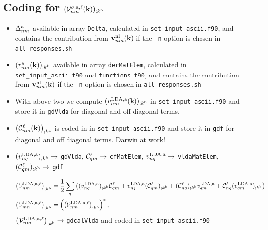 \subsection{Coding for $({\mathbf{\cal V}}^{\sigma,\mathrm{a},\ell}_{nm}(\mathbf{k}))_{;k^{\mathrm{b}}}$}
\begin{itemize}
\item $\Delta^{\mathrm{a}}_{nm}$ available in array \verb=Delta=, 
calculated in \verb=set_input_ascii.f90=,
 and contains the
  contribution from $\mathbf{v}^{\mathrm{nl}}_{nm}(\mathbf{k})$ if the \verb=-n= option is
  chosen in \verb=all_responses.sh= 
\item $(r^{\mathrm{a}}_{nm}(\mathbf{k}))_{;k^{\mathrm{b}}}$
 available in array
  \verb=derMatElem=,
calculated in \verb=set_input_ascii.f90= and \verb=functions.f90=,
 and contains the
  contribution from $\mathbf{v}^{\mathrm{nl}}_{nm}(\mathbf{k})$ if the \verb=-n= option is
  chosen in \verb=all_responses.sh= 
\item With above two we compute $(v^{\mathrm{LDA},\mathrm{a}}_{nm}(\mathbf{k}))_{;k^{\mathrm{b}}}$ 
in \verb=set_input_ascii.f90=  and store it in \verb=gdVlda= for
diagonal and off diagonal terms.
\item $\big({\mathbf{\cal C}}^\ell_{nm}(\mathbf{k})\big)_{;k^{\mathrm{a}}}$ is coded in 
in \verb=set_input_ascii.f90=  and store it in \verb=gdf= for
diagonal and off diagonal terms. Darwin at work!
\item $(v^{\mathrm{LDA},\mathrm{a}}_{nq})_{;k^{\mathrm{b}}}\to$ \verb=gdVlda=,
  ${\mathbf{\cal C}}^\ell_{qm}\to$ \verb=cfMatElem=,
$v^{\mathrm{LDA},\mathrm{a}}_{nq}\to$ \verb=vldaMatElem=, 
$({\mathbf{\cal C}}^\ell_{qm})_{;k^{\mathrm{b}}}\to$
\verb=gdf=

 \begin{align}\label{c-a.2nn}
\left({\mathbf{\cal V}}^{\mathrm{LDA},\mathrm{a},\ell}_{nm}\right)_{;k^{\mathrm{b}}}
&=
\frac{1}{2}\sum_q\left(
(v^{\mathrm{LDA},\mathrm{a}}_{nq})_{;k^{\mathrm{b}}}{\mathbf{\cal C}}^\ell_{qm}
+ 
v^{\mathrm{LDA},\mathrm{a}}_{nq}({\mathbf{\cal C}}^\ell_{qm})_{;k^{\mathrm{b}}}
+
({\mathbf{\cal C}}^\ell_{nq})_{;k^{\mathrm{b}}} v^{\mathrm{LDA},\mathrm{a}}_{qm}
+
{\mathbf{\cal C}}^\ell_{nq} (v^{\mathrm{LDA},\mathrm{a}}_{qm})_{;k^{\mathrm{b}}}
\right)
\nonumber\\
\left({\mathbf{\cal V}}^{\mathrm{LDA},\mathrm{a},\ell}_{mn}\right)_{;k^{\mathrm{b}}}&=\left(\left({\mathbf{\cal V}}^{\mathrm{LDA},\mathrm{a},\ell}_{nm}\right)_{;k^{\mathrm{b}}}\right)^*
,
\end{align} 
$\left({\mathbf{\cal V}}^{\mathrm{LDA},\mathrm{a},\ell}_{nm}\right)_{;k^{\mathrm{b}}}\to$
\verb=gdcalVlda= and coded in \verb=set_input_ascii.f90=
\end{itemize}

